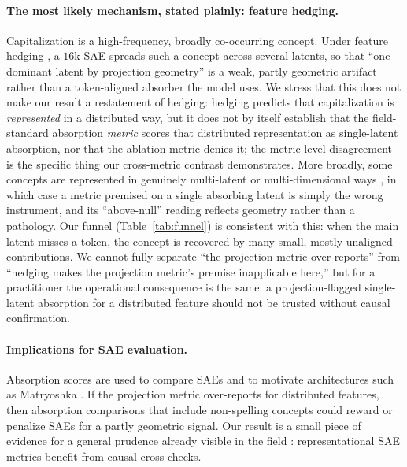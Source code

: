 \documentclass[11pt]{article}
\theoremstyle{definition}
\begin{document}
\paragraph{The most likely mechanism, stated plainly: feature hedging.}
Capitalization is a high-frequency, broadly co-occurring concept. Under feature hedging
\citep{chanin2025hedging}, a $16$k SAE spreads such a concept across several latents, so that ``one dominant
latent by projection geometry'' is a weak, partly geometric artifact rather than a token-aligned absorber
the model uses. We stress that this does not make our result a restatement of hedging: hedging predicts that
capitalization is \emph{represented} in a distributed way, but it does not by itself establish that the
field-standard absorption \emph{metric} scores that distributed representation as single-latent absorption,
nor that the ablation metric denies it; the metric-level disagreement is the specific thing our cross-metric
contrast demonstrates. More broadly, some concepts are represented in genuinely multi-latent or multi-dimensional
ways \citep{engels2024multidim}, in which case a metric premised on a single absorbing latent is simply the
wrong instrument, and its ``above-null'' reading reflects geometry rather than a pathology. Our funnel (Table~\ref{tab:funnel}) is consistent with this: when the main latent misses a
token, the concept is recovered by many small, mostly unaligned contributions. We cannot fully separate
``the projection metric over-reports'' from ``hedging makes the projection metric's premise inapplicable
here,'' but for a practitioner the operational consequence is the same: a projection-flagged single-latent
absorption for a distributed feature should not be trusted without causal confirmation.

\paragraph{Implications for SAE evaluation.}
Absorption scores are used to compare SAEs and to motivate architectures such as Matryoshka
\citep{bussmann2025matryoshka}. If the projection metric over-reports for distributed features, then
absorption comparisons that include non-spelling concepts could reward or penalize SAEs for a
partly geometric signal. Our result is a small piece of evidence for a general prudence already visible in
the field \citep{kantamneni2025saeprobing}: representational SAE metrics benefit from causal cross-checks.
\end{document}
